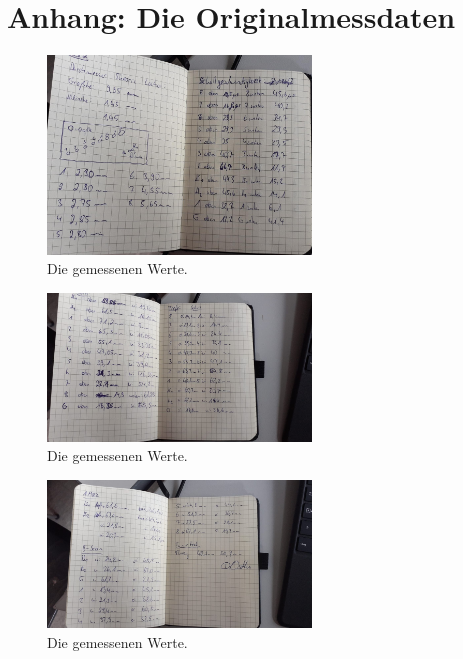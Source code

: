 \section{Anhang: Die Originalmessdaten}
\label{sec:anhang}

\begin{figure}
    \centering
    \includegraphics[width = 7cm]{content/mess1}
    \caption{Die gemessenen Werte.}
    \label{fig:mess1}
\end{figure}


\begin{figure}
    \centering
    \includegraphics[width = 7cm]{content/mess2}
    \caption{Die gemessenen Werte.}
    \label{fig:mess2}
\end{figure}


\begin{figure}
    \centering
    \includegraphics[width = 7cm]{content/mess3}
    \caption{Die gemessenen Werte.}
    \label{fig:mess3}
\end{figure}
